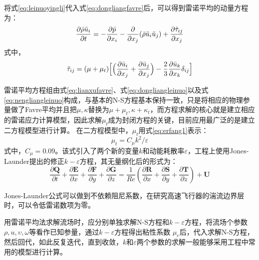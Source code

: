 将式\eqref{eq:leinuoyingli}代入式\eqref{eq:dongliangfavre}后，可以得到雷诺平均的动量方程为：
\begin{equation}
\frac{\partial\bar{\rho}\tilde{u}_i}{\partial t}=-\frac{\partial\bar{p}}{\partial x_i}-\frac{\partial}{\partial x_j}(\bar{\rho}\tilde{u}_i\tilde{u}_j)+\frac{\partial\tilde{\tau}_{ij}}{\partial x_j}\label{eq:dongliangleinuo}\\
\end{equation}
式中，\vspace{-0.5em}\[\tilde{\tau}_{ij}=(\mu+\mu_t)\Bigl[\Bigl(\frac{\partial \bar{u}_i}{\partial x_j}+\frac{\partial \bar{u}_j}{\partial x_j}\Bigr)-\frac{2}{3}\frac{\partial\bar{u}_k}{\partial x_k}\delta_{ij}\Bigr]\]

雷诺平均方程组由式\eqref{eq:lianxufavre}、式\eqref{eq:dongliangleinuo}以及式\eqref{eq:nengliangleinuo}构成，与基本的N-S方程基本保持一致，只是将相应的物理参量做了Favre平均并且把$\mu,\kappa$替换为$\mu+\mu_t,\kappa+\kappa_t$，而方程求解的核心就是建立相应的雷诺应力计算模型，因此求解$\mu_t$成为封闭方程的关键\cite{sharma2004}，目前应用最广泛的是建立二方程模型进行计算。
在二方程模型中，$\mu_t$用式\eqref{eq:erfang1}表示：
\begin{equation}
\mu_t=C_\mu k^2/\varepsilon
\label{eq:erfang1}
\end{equation}
式中，$C_\mu=0.09$。该式引入了两个新的变量$k$和动能耗散率$\varepsilon$，工程上使用Jones-Launder提出的修正$k-\varepsilon$方程\cite{jones1972,jones1973}，其无量纲化后的形式为：
\begin{equation}
\frac{\partial\mathbf{Q}}{\partial t}+\frac{\partial\mathbf{E}}{\partial x}+\frac{\partial\mathbf{F}}{\partial y}+\frac{\partial\mathbf{G}}{\partial z}=\frac{1}{Re}(\frac{\partial\mathbf{R}}{\partial x}+\frac{\partial\mathbf{S}}{\partial y}+\frac{\partial\mathbf{T}}{\partial z})+\mathbf{U}
\label{eq:erfangcheng}
\end{equation}

Jones-Launder公式可以做到不依赖阻尼系数，在研究高速飞行器的湍流边界层时，可以令低雷诺数项为零。

用雷诺平均法求解流场时，应分别单独求解N-S方程和$k-\varepsilon$方程，将流场个参数$\rho,u,\upsilon,\omega$等看作已知参量，通过$k-\varepsilon$方程得出粘性系数 $\mu_e$后，代入求解N-S方程，然后回代，如此反复迭代，直到收敛，$k$和$\varepsilon$两个参数的求解一般能够采用工程中常用的模型进行计算。

